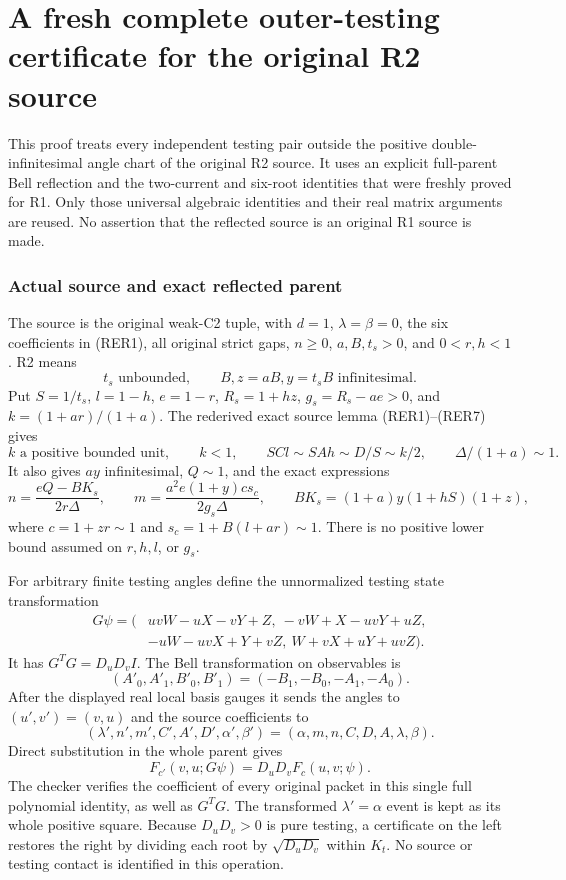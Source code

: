 \section{\texorpdfstring{A fresh complete outer-testing certificate for the original R2 source}{A fresh complete outer-testing certificate for the original R2 source}}
\label{component:p8f8780350b13}

\label{p8f8780350b13:sec:r2-rederived-outer-join}

This proof treats every independent testing pair outside the positive
double-infinitesimal angle chart of the original R2 source.  It uses an
explicit full-parent Bell reflection and the two-current and six-root
identities that were freshly proved for R1.  Only those universal algebraic
identities and their real matrix arguments are reused.  No assertion that
the reflected source is an original R1 source is made.

\subsubsection*{Actual source and exact reflected parent}

The source is the original weak-C2 tuple, with $d=1$, $\lambda=\beta=0$,
the six coefficients in (RER1), all original strict gaps, $n\geq0$,
$a,B,t_s>0$, and $0<r,h<1$.  R2 means
\[
t_s\text{ unbounded},\qquad B, z=aB, y=t_sB\text{ infinitesimal}.
\tag{R2O1}
\]
Put $S=1/t_s$, $l=1-h$, $e=1-r$, $R_s=1+hz$,
$g_s=R_s-ae>0$, and $k=(1+ar)/(1+a)$.  The rederived exact source
lemma (RER1)--(RER7) gives
\[
k\text{ a positive bounded unit},\qquad k<1,\qquad
SC l\sim SAh\sim D/S\sim k/2,
\qquad \Delta/(1+a)\sim1.
\tag{R2O2}
\]
It also gives $ay$ infinitesimal, $Q\sim1$, and the exact expressions
\[
n=\frac{eQ-BK_s}{2r\Delta},\qquad
m=\frac{a^2e(1+y)c s_c}{2g_s\Delta},\qquad
BK_s=(1+a)y(1+hS)(1+z),
\tag{R2O3}
\]
where $c=1+zr\sim1$ and $s_c=1+B(l+ar)\sim1$.
There is no positive lower bound assumed on $r,h,l$, or $g_s$.

For arbitrary finite testing angles define the unnormalized testing
state transformation
\[
\begin{split}
G\psi=(&uvW-uX-vY+Z,\ -vW+X-uvY+uZ,\\
       &-uW-uvX+Y+vZ,\ W+vX+uY+uvZ).
\end{split}
\tag{R2O4}
\]
It has $G^TG=D_uD_v I$.  The Bell transformation on observables is
\[
(A'_0,A'_1,B'_0,B'_1)=(-B_1,-B_0,-A_1,-A_0).
\]
After the displayed real local basis gauges it sends the angles to
$(u',v')=(v,u)$ and the source coefficients to
\[
(\lambda',n',m',C',A',D',\alpha',\beta')
 =(\alpha,m,n,C,D,A,\lambda,\beta).
\tag{R2O5}
\]
Direct substitution in the whole parent gives
\[
F_{c'}(v,u;G\psi)=D_uD_v F_c(u,v;\psi).
\tag{R2O6}
\]
The checker verifies the coefficient of every original packet in this
single full polynomial identity, as well as $G^TG$.  The transformed
$\lambda'=\alpha$ event is kept as its whole positive square.
Because $D_uD_v>0$ is pure testing, a certificate on the left restores
the right by dividing each root by $\sqrt{D_uD_v}$ within $K_t$.
No source or testing contact is identified in this operation.

